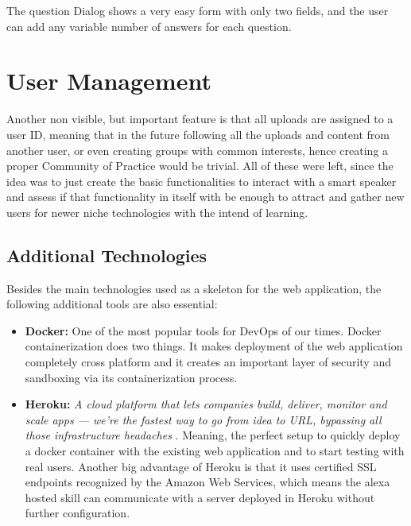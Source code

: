 The question Dialog shows a very easy form with only two fields, and the user can add 
any variable number of answers for each question.

\section{User Management}

Another non visible, but important feature is that all uploads are assigned to a user ID, 
meaning that in the future following all the uploads and content from another user, or
even creating groups with common interests, hence creating a proper Community of Practice
would be trivial. All of these were left, since the idea was to just create the basic 
functionalities to interact with a smart speaker and assess if that functionality in itself
with be enough to attract and gather new users for newer niche technologies with the
intend of learning.


\subsection{Additional Technologies}

Besides the main technologies used as a skeleton for the web application, 
the following additional tools are also essential:

\begin{itemize}
\item \textbf{Docker:} One of the most popular tools for DevOps of our times. Docker 
    containerization does two things. It makes deployment of the web application completely
    cross platform and it creates an important layer of security and sandboxing 
    via its containerization process.

\item \textbf{Heroku:} \textit{A cloud platform that lets companies build, deliver, monitor and 
    scale apps — we're the fastest way to go from idea to URL, bypassing all those 
    infrastructure headaches} \cite{heroku}. Meaning, the perfect setup to quickly deploy a docker
    container with the existing web application and to start testing with real users.
    Another big advantage of Heroku is that it uses certified SSL endpoints recognized
    by the Amazon Web Services, which means the alexa hosted skill can communicate 
    with a server deployed in Heroku without further configuration.

\end{itemize}

